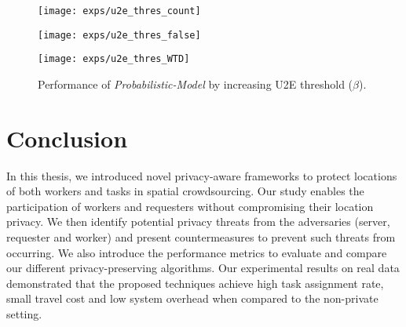 \documentclass{USC-Thesis}
\numberwithin{equation}{chapter}
\begin{document}
\begin{figure}[!ht]
	\begin{minipage}[b]{0.32\linewidth}
	\centering
		\texttt{[image: exps/u2e\_thres\_count]}
		\label{fig:u2e_thres_count}
	\end{minipage}
	\begin{minipage}[b]{0.32\linewidth}
		\centering
		\texttt{[image: exps/u2e\_thres\_false]}
		\label{fig:u2e_thres_false}
	\end{minipage}
	\begin{minipage}[b]{0.32\linewidth}
	\centering
		\texttt{[image: exps/u2e\_thres\_WTD]}
		\label{fig:u2e_thres_WTD}
	\end{minipage}
	\caption{Performance of \emph{Probabilistic-Model} by increasing U2E threshold ($\beta$).}
\label{fig:vary_beta}
\end{figure}

\chapter{Conclusion}

In this thesis, we introduced novel privacy-aware frameworks to protect locations of both workers and tasks in spatial crowdsourcing. Our study enables the participation of workers and requesters without compromising their location privacy. We then identify potential privacy threats from the adversaries (server, requester and worker) and present countermeasures to prevent such threats from occurring. We also introduce the performance metrics to evaluate and compare our different privacy-preserving algorithms.  Our experimental results on real data demonstrated that the proposed techniques achieve high task assignment rate, small travel cost and low system overhead when compared to the non-private setting.

%
%



\balance

%
\end{document}
